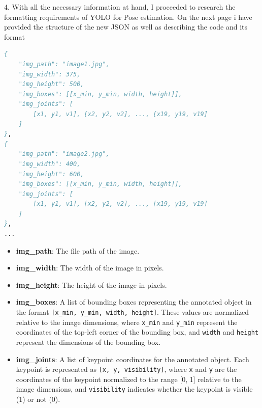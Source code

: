 4. With all the necessary information at hand, I proceeded to research the formatting requirements of YOLO for Pose estimation.
\newline
\newline
\newline
\newline
\newline
\newline
\newline
\newline
\newline
\newline
\newline
\newline
\newline
\newline
On the next page i have provided the structure of the new JSON as well as describing the code and its format
\newpage
\begin{lstlisting}[language=Pascal, caption={New Json Format}, label={lst:}, basicstyle=\ttfamily\scriptsize, frame=single]
{
    "img_path": "image1.jpg",
    "img_width": 375,
    "img_height": 500,
    "img_boxes": [[x_min, y_min, width, height]],
    "img_joints": [
        [x1, y1, v1], [x2, y2, v2], ..., [x19, y19, v19]
    ]
},
{
    "img_path": "image2.jpg",
    "img_width": 400,
    "img_height": 600,
    "img_boxes": [[x_min, y_min, width, height]],
    "img_joints": [
        [x1, y1, v1], [x2, y2, v2], ..., [x19, y19, v19]
    ]
},
...
\end{lstlisting}
\begin{itemize}
    \item \textbf{img\_path}: The file path of the image.
    \item \textbf{img\_width}: The width of the image in pixels.
    \item \textbf{img\_height}: The height of the image in pixels.
    \item \textbf{img\_boxes}: A list of bounding boxes representing the annotated object in the format \texttt{[x\_min, y\_min, width, height]}. These values are normalized relative to the image dimensions, where \texttt{x\_min} and \texttt{y\_min} represent the coordinates of the top-left corner of the bounding box, and \texttt{width} and \texttt{height} represent the dimensions of the bounding box.
    \item \textbf{img\_joints}: A list of keypoint coordinates for the annotated object. Each keypoint is represented as \texttt{[x, y, visibility]}, where \texttt{x} and \texttt{y} are the coordinates of the keypoint normalized to the range [0, 1] relative to the image dimensions, and \texttt{visibility} indicates whether the keypoint is visible (1) or not (0).
\end{itemize}
\newpage


